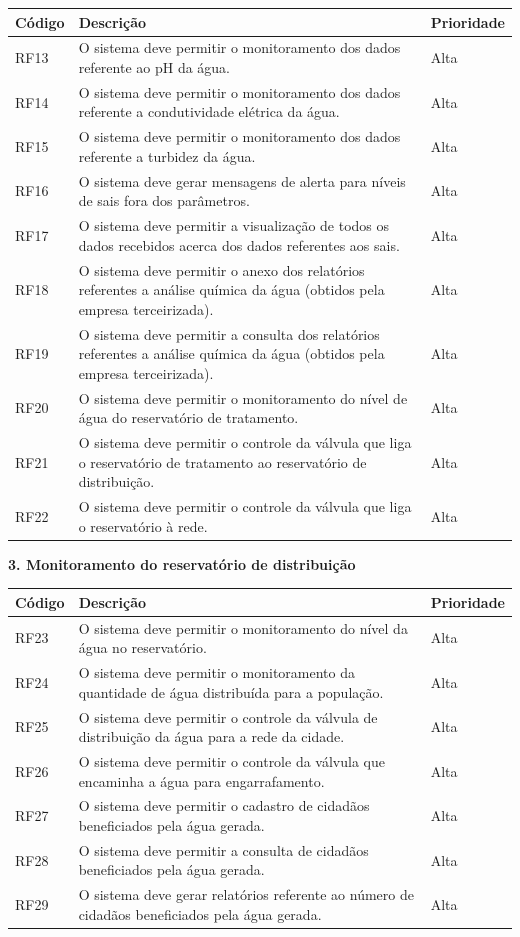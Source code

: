     \begin{longtable}{|m{3.0cm}|m{7.5cm}|m{3.5cm}|}
      \hline
\textbf{Código} & \textbf{Descrição} & \textbf{Prioridade}\\
\hline
RF13 & O sistema deve permitir o monitoramento dos dados referente ao pH da água. & Alta\\
\hline
RF14 & O sistema deve permitir o monitoramento dos dados referente a condutividade elétrica da água. & Alta\\
\hline
RF15 & O sistema deve permitir o monitoramento dos dados referente a turbidez da água. & Alta\\
\hline
RF16 & O sistema deve gerar mensagens de alerta para níveis de sais fora dos parâmetros. & Alta\\
\hline
RF17 & O sistema deve permitir a visualização de todos os dados recebidos acerca dos dados referentes aos sais. & Alta\\ 
\hline
RF18 & O sistema deve permitir o anexo dos relatórios referentes a análise química da água (obtidos pela empresa terceirizada). & Alta\\
\hline
RF19 & O sistema deve permitir a consulta dos relatórios referentes a análise química da água (obtidos pela empresa terceirizada). & Alta\\
\hline
RF20 & O sistema deve permitir o monitoramento do nível de água do reservatório de tratamento. & Alta\\
\hline
RF21 & O sistema deve permitir o controle da válvula que liga o reservatório de tratamento ao reservatório de distribuição. & Alta\\
\hline
RF22 & O sistema deve permitir o controle da válvula que liga o reservatório à rede. & Alta\\
\hline
  \end{longtable}
  \pagebreak
  \textbf{3. Monitoramento do reservatório de distribuição}
  
    \begin{longtable}{|m{3.0cm}|m{7.5cm}|m{3.5cm}|}
      \hline
\textbf{Código} & \textbf{Descrição} & \textbf{Prioridade}\\
\hline
RF23 & O sistema deve permitir o monitoramento do nível da água no reservatório. & Alta\\
\hline
RF24 & O sistema deve permitir o monitoramento da quantidade de água distribuída para a população. & Alta\\
\hline
RF25 & O sistema deve permitir o controle da válvula de distribuição da água para a rede da cidade. & Alta\\
\hline
RF26 & O sistema deve permitir o controle da válvula que encaminha a água para engarrafamento. & Alta\\
\hline
RF27 & O sistema deve permitir o cadastro de cidadãos beneficiados pela água gerada. & Alta\\
\hline
RF28 & O sistema deve permitir a consulta de cidadãos beneficiados pela água gerada. & Alta\\
\hline
RF29 & O sistema deve gerar relatórios referente ao número de cidadãos beneficiados pela água gerada. & Alta\\
\hline
  \end{longtable}
  
